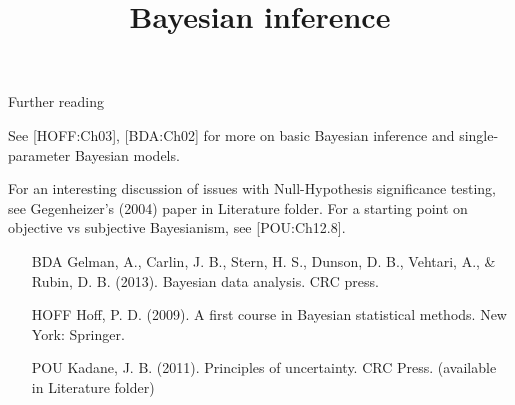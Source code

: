 

\title[Bayesian inference]{Bayesian inference}



\begin{frame}{Further reading}

See [HOFF:Ch03], [BDA:Ch02] for more on basic Bayesian inference and single-parameter Bayesian models.

For an interesting discussion of issues with Null-Hypothesis significance testing, see Gegenheizer's (2004) paper in Literature folder. For a starting point on objective vs subjective Bayesianism, see [POU:Ch12.8].

\bigskip

\begin{scriptsize}
\begin{itemize}
\item[BDA] Gelman, A., Carlin, J. B., Stern, H. S., Dunson, D. B., Vehtari, A., \& Rubin, D. B. (2013). Bayesian data analysis. CRC press.
\item[HOFF] Hoff, P. D. (2009). A first course in Bayesian statistical methods. New York: Springer.
\item [POU] Kadane, J. B. (2011). Principles of uncertainty. CRC Press. (available in Literature folder)
\end{itemize}
\end{scriptsize}
\end{frame}


